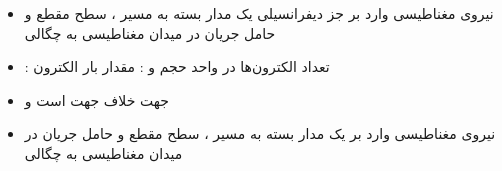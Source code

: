 \ELhold


\begin{ELunit}

\begin{itemize}
\tightlist
\item
  نیروی مغناطیسی وارد بر جز دیفرانسیلی یک مدار بسته به مسیر ، سطح مقطع  و حامل جریان  در میدان مغناطیسی به چگالی 
\end{itemize}



\end{ELunit}

\begin{ELjoin}

\begin{itemize}
\tightlist
\item
  : تعداد الکترون‌ها در واحد حجم و : مقدار بار الکترون
\item
  جهت \ELim{\dif\vect{\ell}} خلاف جهت  است و 
\end{itemize}

\begin{ELimportant}{}


\end{ELimportant}

\end{ELjoin}

\begin{ELjoin}

\begin{itemize}
\tightlist
\item
  نیروی مغناطیسی وارد بر یک مدار بسته به مسیر ، سطح مقطع  و حامل جریان  در میدان مغناطیسی به چگالی 
\end{itemize}

\begin{ELimportant}{}


\end{ELimportant}

\end{ELjoin}

